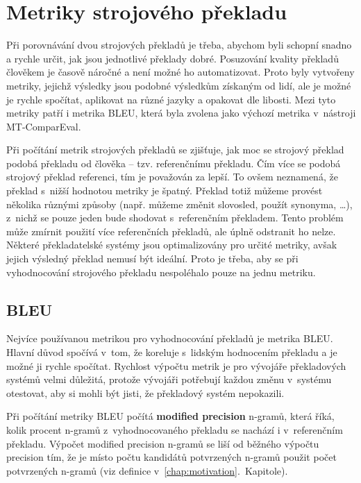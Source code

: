 \chapter{Metriky strojového překladu}
\label{chap:metrics}

Při porovnávání dvou strojových překladů je třeba,
  abychom byli schopní snadno a rychle určit,
  jak jsou jednotlivé překlady dobré.
Posuzování kvality překladů člověkem je časově náročné
  a není možné ho automatizovat.
Proto byly vytvořeny metriky,
  jejichž výsledky jsou podobné výsledkům získaným od lidí,
  ale je možné je rychle spočítat,
  aplikovat na různé jazyky a opakovat dle libosti.
Mezi tyto metriky patří i metrika BLEU,
  která byla zvolena jako výchozí metrika v~nástroji \mbox{MT-ComparEval}.

Při počítání metrik strojových překladů se zjišťuje,
  jak moc se strojový překlad podobá překladu od člověka -- tzv. referenčnímu překladu.
Čím více se podobá strojový překlad referenci,
  tím je považován za lepší.
To ovšem neznamená, že překlad s~nižší hodnotou metriky je špatný.
Překlad totiž můžeme provést několika různými způsoby 
  (např. můžeme změnit slovosled, použít synonyma, \dots),
  z~nichž se pouze jeden bude shodovat s~referenčním překladem.
Tento problém může zmírnit použití více referenčních překladů,
  ale úplně odstranit ho nelze.
Některé překladatelské systémy jsou optimalizovány pro určité metriky,
  avšak jejich výsledný překlad nemusí být ideální.
Proto je třeba,
  aby se při vyhodnocování strojového překladu nespoléhalo pouze na jednu metriku.


\section{BLEU}
Nejvíce používanou metrikou pro vyhodnocování překladů je metrika BLEU.
Hlavní důvod spočívá v~tom,
  že koreluje s~lidským hodnocením překladu
  a je možné ji rychle spočítat.
Rychlost výpočtu metrik je pro vývojáře překladových systémů velmi důležitá,
  protože vývojáři potřebují každou změnu v~systému otestovat,
  aby si mohli být jisti,
  že překladový systém nepokazili.

Při počítání metriky BLEU počítá \textbf{modified precision} \mbox{n-gramů},
  která říká,
  kolik procent \mbox{n-gramů} z~vyhodnocovaného překladu se nachází i v~referenčním překladu.	
Výpočet modified precision \mbox{n-gramů} se liší od běžného výpočtu precision tím,
  že je místo počtu kandidátů potvrzených \mbox{n-gramů} použit počet potvrzených \mbox{n-gramů} (viz definice v~\ref{chap:motivation}.~Kapitole).

